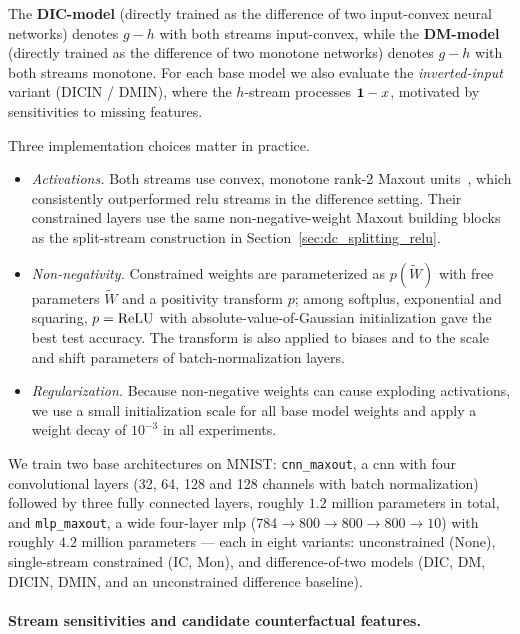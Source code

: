 The \textbf{DIC-model} (directly trained as the difference of two input-convex neural networks) denotes $g-h$ with both streams input-convex, while the \textbf{DM-model} (directly trained as the difference of two monotone networks) denotes $g-h$ with both streams monotone. For each base model we also evaluate the \emph{inverted-input} variant (DICIN / DMIN), where the $h$-stream processes $\mathbf{1}-x$, motivated by sensitivities to missing features.

Three implementation choices matter in practice.
\begin{itemize}
	\item \emph{Activations.} Both streams use convex, monotone rank-2 Maxout units~\parencite{Goodfellow2013Maxout}, which consistently outperformed \ac{relu} streams in the difference setting. Their constrained layers use the same non-negative-weight Maxout building blocks as the split-stream construction in Section~\ref{sec:dc_splitting_relu}.
	\item \emph{Non-negativity.} Constrained weights are parameterized as $p(\tilde{W})$ with free parameters $\tilde{W}$ and a positivity transform $p$; among softplus, exponential and squaring, $p = \text{ReLU}$ with absolute-value-of-Gaussian initialization gave the best test accuracy. The transform is also applied to biases and to the scale and shift parameters of batch-normalization layers.
	\item \emph{Regularization.} Because non-negative weights can cause exploding activations, we use a small initialization scale for all base model weights and apply a weight decay of $10^{-3}$ in all experiments.
\end{itemize}

We train two base architectures on MNIST: \texttt{cnn\_maxout}, a \ac{cnn} with four convolutional layers (32, 64, 128 and 128 channels with batch normalization) followed by three fully connected layers, roughly $1.2$ million parameters in total, and \texttt{mlp\_maxout}, a wide four-layer \ac{mlp} ($784 \to 800 \to 800 \to 800 \to 10$) with roughly $4.2$ million parameters --- each in eight variants: unconstrained (None), single-stream constrained (IC, Mon), and difference-of-two models (DIC, DM, DICIN, DMIN, and an unconstrained difference baseline).

\paragraph{Stream sensitivities and candidate counterfactual features.}\label{subsec:counterfactual_features}

